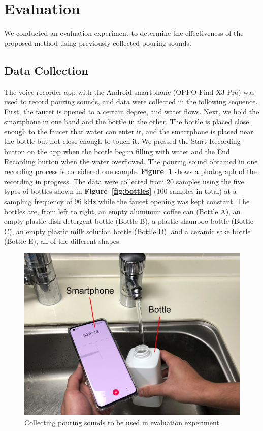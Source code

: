\documentclass[sigconf]{acmart}
\newcommand\figref[1]{\textbf{Figure~\ref{fig:#1}}}
\begin{document}
\section{Evaluation}
\label{sec:evaluation}
We conducted an evaluation experiment to determine the effectiveness of the proposed method using previously collected pouring sounds.

\subsection{Data Collection}
The voice recorder app with the Android smartphone (OPPO Find X3 Pro) was used to record pouring sounds, and data were collected in the following sequence. First, the faucet is opened to a certain degree, and water flows. Next, we hold the smartphone in one hand and the bottle in the other. The bottle is placed close enough to the faucet that water can enter it, and the smartphone is placed near the bottle but not close enough to touch it. We pressed the Start Recording button on the app when the bottle began filling with water and the End Recording button when the water overflowed. The pouring sound obtained in one recording process is considered one sample. \figref{data_acquisition} shows a photograph of the recording in progress. The data were collected from 20 samples using the five types of bottles shown in \figref{bottles} (100 samples in total) at a sampling frequency of 96 kHz while the faucet opening was kept constant. The bottles are, from left to right, an empty aluminum coffee can (Bottle A), an empty plastic dish detergent bottle (Bottle B), a plastic shampoo bottle (Bottle C), an empty plastic milk solution bottle (Bottle D), and a ceramic sake bottle (Bottle E), all of the different shapes.

\begin{figure}[!t]
  \centering
  \includegraphics[width=0.5\linewidth]{figures/data_acquisition.eps}
  \caption{Collecting pouring sounds to be used in evaluation experiment.}
  \label{fig:data_acquisition}
\end{figure}
\end{document}
